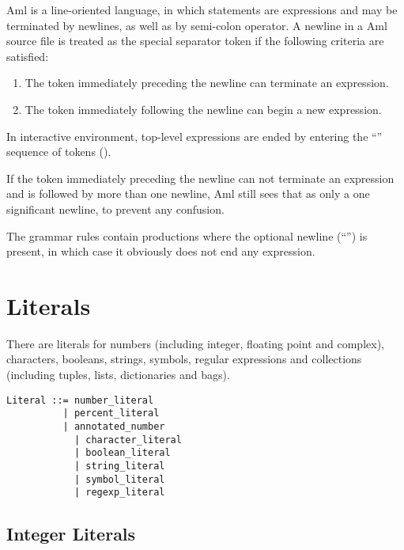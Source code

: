 Aml is a line-oriented language, in which statements are expressions and may be terminated by newlines, as well as by semi-colon operator. A newline in a Aml source file is treated as the special separator token \lstinline@nl@ if the following criteria are satisfied:

\begin{enumerate}
  \item The token immediately preceding the newline can terminate an expression.
  \item The token immediately following the newline can begin a new expression. 
\end{enumerate}

In interactive environment, top-level expressions are ended by entering the ``\code{;;}'' sequence of tokens (). 

If the token immediately preceding the newline can not terminate an expression and is followed by more than one newline, Aml still sees that as only a one significant newline, to prevent any confusion.

The grammar rules contain productions where the optional newline (``\code{[nl]}'') is present, in which case it obviously does not end any expression. 






\section{Literals}
\label{sec:literals}

There are literals for numbers (including integer, floating point and complex), characters, booleans, strings, symbols, regular expressions and collections (including tuples, lists, dictionaries and bags). 

\syntax\begin{lstlisting}
Literal ::= number_literal
          | percent_literal
          | annotated_number
	        | character_literal
	        | boolean_literal
	        | string_literal
	        | symbol_literal
	        | regexp_literal
\end{lstlisting}






\subsection{Integer Literals}
\label{sec:integerliterals}

